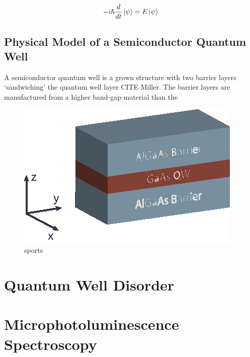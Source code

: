 \begin{equation}
-i\hbar \frac{d}{dt} \ket{\psi} = E \ket{\psi}
\end{equation}

\subsection{Physical Model of a Semiconductor Quantum Well}
A semiconductor quantum well is a grown structure with two barrier layers `sandwiching' the quantum well layer CITE Miller. The barrier layers are manufactured from a higher band-gap material than the 
\begin{figure}[h!]
\centering
\includegraphics[width = .5\textwidth]{Well.eps}
\caption{sports}
\end{figure}

\section{Quantum Well Disorder}




\section{Microphotoluminescence Spectroscopy}
